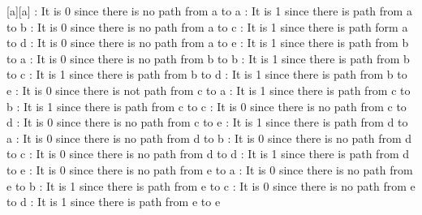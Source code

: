 \documentclass[a4 paper]{article}
\numberwithin{equation}{section}
\newcommand{\0}{\mathbf{0}}
\begin{document}
[a][a] : It is 0 since there is no path from a to a \newline
[a][b] : It is 1 since there is path from a to b \newline
[a][c] : It is 0 since there is no path from a to c \newline
[a][d] : It is 1 since there is path form a to d \newline
[a][e] : It is 0 since there is no path from a to e \newline
\newline
[b][a] : It is 1 since there is path from b to a \newline
[b][b] : It is 0 since there is no path from b to b \newline
[b][c] : It is 1 since there is path from b to c \newline
[b][d] : It is 1 since there is path from b to d \newline
[b][e] : It is 1 since there is path from b to e \newline
\newline
[c][a] : It is 0 since there is not path from c to a \newline
[c][b] : It is 1 since there is path from c to b \newline
[c][c] : It is 1 since there is path from c to c \newline
[c][d] : It is 0 since there is no path from c to d \newline
[c][e] : It is 0 since there is no path from c to e \newline
\newline
[d][a] : It is 1 since there is path from d to a \newline
[d][b] : It is 0 since there is no path from d to b \newline
[d][c] : It is 0 since there is no path from d to c \newline
[d][d] : It is 0 since there is no path from d to d \newline
[d][e] : It is 1 since there is path from d to e \newline
\newline
[e][a] : It is 0 since there is no path from e to a \newline
[e][b] : It is 0 since there is no path from e to b \newline
[e][c] : It is 1 since there is path from e to c \newline
[e][d] : It is 0 since there is no path from e to d \newline
[e][e] : It is 1 since there is path from e to e \newline
\newline
\end{document}
